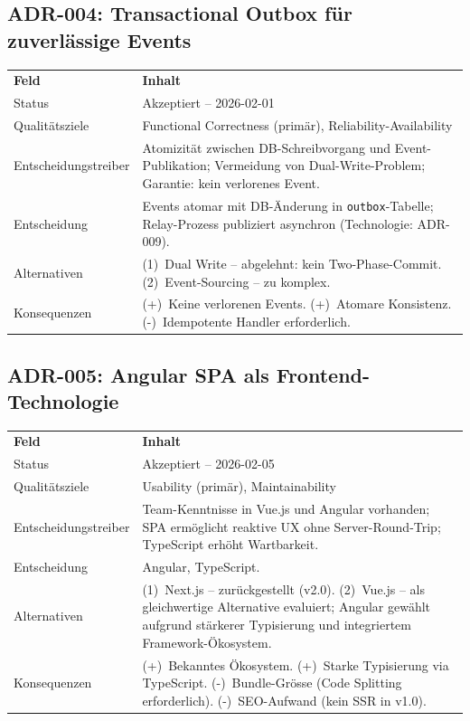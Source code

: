 \subsection{ADR-004: Transactional Outbox für zuverlässige Events}

\begin{tabularx}{\textwidth}{L{3.5cm} X}
  \color{white}\textbf{Feld} & \color{white}\textbf{Inhalt} \\
  Status & Akzeptiert -- 2026-02-01 \\
  Qualitätsziele & Functional Correctness (primär), Reliability-Availability \\
  Entscheidungstreiber & Atomizität zwischen DB-Schreibvorgang und Event-Publikation; Vermeidung von Dual-Write-Problem; Garantie: kein verlorenes Event. \\
  Entscheidung & Events atomar mit DB-Änderung in \texttt{outbox}-Tabelle; Relay-Prozess publiziert asynchron (Technologie: ADR-009). \\
  Alternativen & (1)~Dual Write -- abgelehnt: kein Two-Phase-Commit. (2)~Event-Sourcing -- zu komplex. \\
  Konsequenzen & (+)~Keine verlorenen Events. (+)~Atomare Konsistenz. (-)~Idempotente Handler erforderlich. \\
\end{tabularx}

\subsection{ADR-005: Angular SPA als Frontend-Technologie}

\begin{tabularx}{\textwidth}{L{3.5cm} X}
  \color{white}\textbf{Feld} & \color{white}\textbf{Inhalt} \\
  Status & Akzeptiert -- 2026-02-05 \\
  Qualitätsziele & Usability (primär), Maintainability \\
  Entscheidungstreiber & Team-Kenntnisse in Vue.js und Angular vorhanden; SPA ermöglicht reaktive UX ohne Server-Round-Trip; TypeScript erhöht Wartbarkeit. \\
  Entscheidung & Angular, TypeScript. \\
  Alternativen & (1)~Next.js -- zurückgestellt (v2.0). (2)~Vue.js -- als gleichwertige Alternative evaluiert; Angular gewählt aufgrund stärkerer Typisierung und integriertem Framework-Ökosystem. \\
  Konsequenzen & (+)~Bekanntes Ökosystem. (+)~Starke Typisierung via TypeScript. (-)~Bundle-Grösse (Code Splitting erforderlich). (-)~SEO-Aufwand (kein SSR in v1.0). \\
\end{tabularx}

